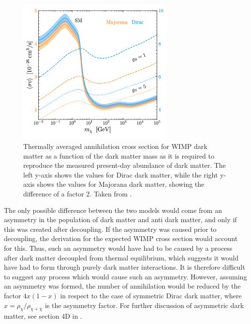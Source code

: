 \begin{figure}[h!]
    \centering
    \includegraphics[width=0.7\textwidth]{figures/sigma_v_dirac_majorana_dm.png}
    \caption{Thermally averaged annihilation cross section for WIMP dark matter as a function of the dark matter mass as it is required to reproduce the measured present-day abundance of dark matter. The left y-axis shows the values for Dirac dark matter, while the right y-axis shows the values for Majorana dark matter, showing the difference of a factor 2. Taken from \cite{Bringmann_2021}. }
    \label{fig:sigmaV_DiracvsMajorana}
\end{figure}

The only possible difference between the two models would come from an asymmetry in the population of dark matter and anti dark matter, and only if this was created after decoupling. If the asymmetry was caused prior to decoupling, the derivation for the expected WIMP cross section would account for this. Thus, such an asymmetry would have had to be caused by a process after dark matter decoupled from thermal equilibrium, which suggests it would have had to form through purely dark matter interactions. It is therefore difficult to suggest any process which would cause such an asymmetry. However, assuming an asymmetry was formed, the number of annihilation would be reduced by the factor $4x(1-x)$ in respect to the case of symmetric Dirac dark matter, where $x = \rho_\chi / \rho_{\chi + \overline{\chi}}$ is the asymmetry factor. For further discussion of asymmetric dark matter, see section 4D in \cite{BAER20151}. 

